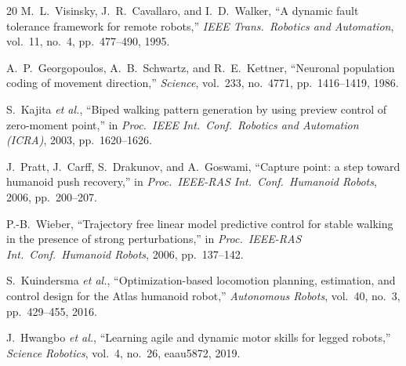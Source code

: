 \begin{thebibliography}{20}
M.~L.~Visinsky, J.~R.~Cavallaro, and I.~D.~Walker, ``A dynamic fault tolerance
framework for remote robots,'' \emph{IEEE Trans.\ Robotics and Automation},
vol.~11, no.~4, pp.~477--490, 1995.

A.~P.~Georgopoulos, A.~B.~Schwartz, and R.~E.~Kettner, ``Neuronal population
coding of movement direction,'' \emph{Science}, vol.~233, no.~4771,
pp.~1416--1419, 1986.

S.~Kajita \emph{et al.}, ``Biped walking pattern generation by using preview
control of zero-moment point,'' in \emph{Proc.\ IEEE Int.\ Conf.\ Robotics and
Automation (ICRA)}, 2003, pp.~1620--1626.

J.~Pratt, J.~Carff, S.~Drakunov, and A.~Goswami, ``Capture point: a step toward
humanoid push recovery,'' in \emph{Proc.\ IEEE-RAS Int.\ Conf.\ Humanoid
Robots}, 2006, pp.~200--207.

P.-B.~Wieber, ``Trajectory free linear model predictive control for stable
walking in the presence of strong perturbations,'' in \emph{Proc.\ IEEE-RAS
Int.\ Conf.\ Humanoid Robots}, 2006, pp.~137--142.

S.~Kuindersma \emph{et al.}, ``Optimization-based locomotion planning,
estimation, and control design for the Atlas humanoid robot,'' \emph{Autonomous
Robots}, vol.~40, no.~3, pp.~429--455, 2016.

J.~Hwangbo \emph{et al.}, ``Learning agile and dynamic motor skills for legged
robots,'' \emph{Science Robotics}, vol.~4, no.~26, eaau5872, 2019.

\end{thebibliography}

